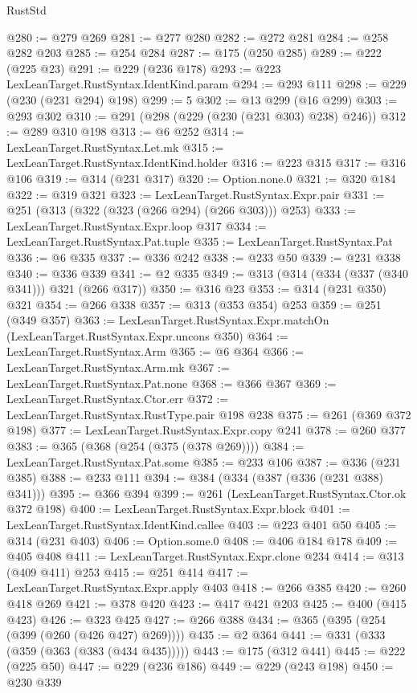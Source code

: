 \begin{lexlean}{RustStd}
\begin{coremodule}
@280 := @279 @269
@281 := @277 @280
@282 := @272 @281
@284 := @258 @282 @203
@285 := @254 @284
@287 := @175 (@250 @285)
@289 := @222 (@225 @23)
@291 := @229 (@236 @178)
@293 := @223 LexLeanTarget.RustSyntax.IdentKind.param
@294 := @293 @111
@298 := @229 (@230 (@231 @294) @198)
@299 := 5
@302 := @13 @299 (@16 @299)
@303 := @293 @302
@310 := @291 (@298 (@229 (@230 (@231 @303) @238) @246))
@312 := @289 @310 @198
@313 := @6 @252
@314 := LexLeanTarget.RustSyntax.Let.mk
@315 := LexLeanTarget.RustSyntax.IdentKind.holder
@316 := @223 @315
@317 := @316 @106
@319 := @314 (@231 @317)
@320 := Option.none.{0}
@321 := @320 @184
@322 := @319 @321
@323 := LexLeanTarget.RustSyntax.Expr.pair
@331 := @251 (@313 (@322 (@323 (@266 @294) (@266 @303))) @253)
@333 := LexLeanTarget.RustSyntax.Expr.loop @317
@334 := LexLeanTarget.RustSyntax.Pat.tuple
@335 := LexLeanTarget.RustSyntax.Pat
@336 := @6 @335
@337 := @336 @242
@338 := @233 @50
@339 := @231 @338
@340 := @336 @339
@341 := @2 @335
@349 := @313 (@314 (@334 (@337 (@340 @341))) @321 (@266 @317))
@350 := @316 @23
@353 := @314 (@231 @350) @321
@354 := @266 @338
@357 := @313 (@353 @354) @253
@359 := @251 (@349 @357)
@363 := LexLeanTarget.RustSyntax.Expr.matchOn (LexLeanTarget.RustSyntax.Expr.uncons @350)
@364 := LexLeanTarget.RustSyntax.Arm
@365 := @6 @364
@366 := LexLeanTarget.RustSyntax.Arm.mk
@367 := LexLeanTarget.RustSyntax.Pat.none
@368 := @366 @367
@369 := LexLeanTarget.RustSyntax.Ctor.err
@372 := LexLeanTarget.RustSyntax.RustType.pair @198 @238
@375 := @261 (@369 @372 @198)
@377 := LexLeanTarget.RustSyntax.Expr.copy @241
@378 := @260 @377
@383 := @365 (@368 (@254 (@375 (@378 @269))))
@384 := LexLeanTarget.RustSyntax.Pat.some
@385 := @233 @106
@387 := @336 (@231 @385)
@388 := @233 @111
@394 := @384 (@334 (@387 (@336 (@231 @388) @341)))
@395 := @366 @394
@399 := @261 (LexLeanTarget.RustSyntax.Ctor.ok @372 @198)
@400 := LexLeanTarget.RustSyntax.Expr.block
@401 := LexLeanTarget.RustSyntax.IdentKind.callee
@403 := @223 @401 @50
@405 := @314 (@231 @403)
@406 := Option.some.{0}
@408 := @406 @184 @178
@409 := @405 @408
@411 := LexLeanTarget.RustSyntax.Expr.clone @234
@414 := @313 (@409 @411) @253
@415 := @251 @414
@417 := LexLeanTarget.RustSyntax.Expr.apply @403
@418 := @266 @385
@420 := @260 @418 @269
@421 := @378 @420
@423 := @417 @421 @203
@425 := @400 (@415 @423)
@426 := @323 @425
@427 := @266 @388
@434 := @365 (@395 (@254 (@399 (@260 (@426 @427) @269))))
@435 := @2 @364
@441 := @331 (@333 (@359 (@363 (@383 (@434 @435)))))
@443 := @175 (@312 @441)
@445 := @222 (@225 @50)
@447 := @229 (@236 @186)
@449 := @229 (@243 @198)
@450 := @230 @339

\end{coremodule}
\end{lexlean}
